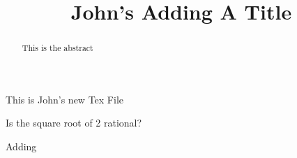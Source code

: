 \documentclass{ximera}
\title{John's Adding A Title}
\begin{document}
\begin{abstract}
This is the abstract
\end{abstract}
\maketitle
This is John's new Tex File

\begin{question}
Is the square root of 2 rational?
	\begin{multipleChoice}
	\end{multipleChoice}
	Adding
\end{question}
\end{document}
